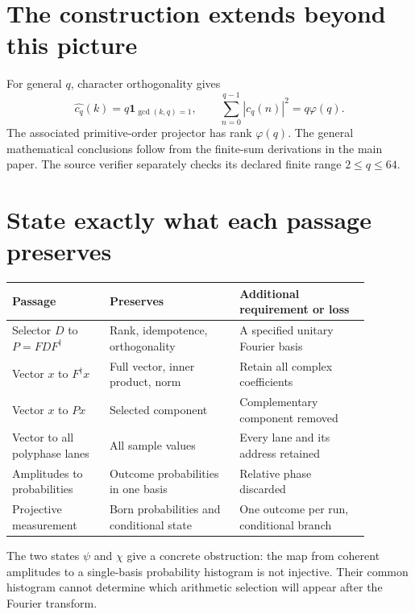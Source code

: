 \clearpage\section*{The construction extends beyond this picture}
For general $q$, character orthogonality gives
\[
 \widehat{c_q}(k)=q\mathbf1_{\gcd(k,q)=1},\qquad
 \sum_{n=0}^{q-1}|c_q(n)|^2=q\varphi(q).
\]
The associated primitive-order projector has rank $\varphi(q)$. The general mathematical conclusions follow from the finite-sum derivations in the main paper. The source verifier separately checks its declared finite range $2\leq q\leq64$.

\clearpage\section*{State exactly what each passage preserves}
\begin{center}
\begin{tabular}{L{0.24\linewidth}L{0.32\linewidth}L{0.32\linewidth}}\toprule
Passage & Preserves & Additional requirement or loss\\\midrule
Selector $D$ to $P=FDF^\dagger$ & Rank, idempotence, orthogonality & A specified unitary Fourier basis\\[5pt]
Vector $x$ to $F^\dagger x$ & Full vector, inner product, norm & Retain all complex coefficients\\[5pt]
Vector $x$ to $Px$ & Selected component & Complementary component removed\\[5pt]
Vector to all polyphase lanes & All sample values & Every lane and its address retained\\[5pt]
Amplitudes to probabilities & Outcome probabilities in one basis & Relative phase discarded\\[5pt]
Projective measurement & Born probabilities and conditional state & One outcome per run, conditional branch\\\bottomrule
\end{tabular}
\end{center}
The two states $\psi$ and $\chi$ give a concrete obstruction: the map from coherent amplitudes to a single-basis probability histogram is not injective. Their common histogram cannot determine which arithmetic selection will appear after the Fourier transform.

